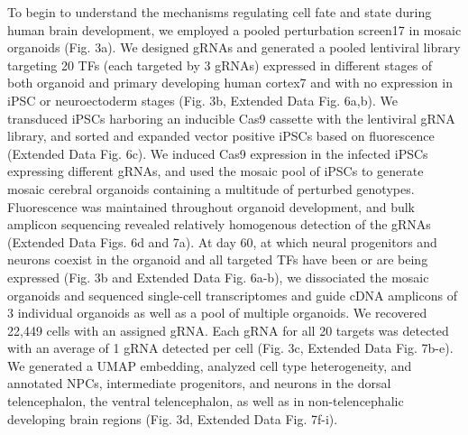To begin to understand the mechanisms regulating cell fate and state during human brain development, we employed a pooled perturbation screen17 in mosaic organoids (Fig. 3a). We designed gRNAs and generated a pooled lentiviral library targeting 20 TFs (each targeted by 3 gRNAs) expressed in different stages of both organoid and primary developing human cortex7 and with no expression in iPSC or neuroectoderm stages (Fig. 3b, Extended Data Fig. 6a,b). We transduced iPSCs harboring an inducible Cas9 cassette with the lentiviral gRNA library, and sorted and expanded vector positive iPSCs based on fluorescence (Extended Data Fig. 6c). We induced Cas9 expression in the infected iPSCs expressing different gRNAs, and used the mosaic pool of iPSCs to generate mosaic cerebral organoids containing a multitude of perturbed genotypes. Fluorescence was maintained throughout organoid development, and bulk amplicon sequencing revealed relatively homogenous detection of the gRNAs (Extended Data Figs. 6d and 7a). At day 60, at which neural progenitors and neurons coexist in the organoid and all targeted TFs have been or are being expressed (Fig. 3b and Extended Data Fig. 6a-b), we dissociated the mosaic organoids and sequenced single-cell transcriptomes and guide cDNA amplicons of 3 individual organoids as well as a pool of multiple organoids. We recovered 22,449 cells with an assigned gRNA. Each gRNA for all 20 targets was detected with an average of 1 gRNA detected per cell (Fig. 3c, Extended Data Fig. 7b-e). We generated a UMAP embedding, analyzed cell type heterogeneity, and annotated NPCs, intermediate progenitors, and neurons in the dorsal telencephalon, the ventral telencephalon, as well as in non-telencephalic developing brain regions (Fig. 3d, Extended Data Fig. 7f-i).
